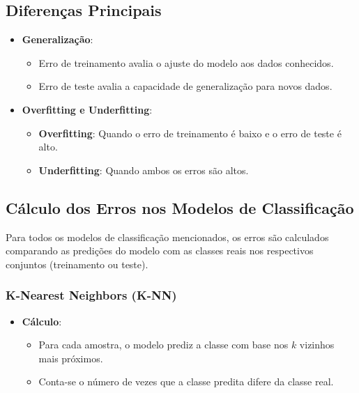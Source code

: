 \documentclass{sciposter}
\begin{document}
\begin{multicols}{3}
\subsection*{Diferenças Principais}

\begin{itemize}
    \item \textbf{Generalização}:
    \begin{itemize}
        \item Erro de treinamento avalia o ajuste do modelo aos dados conhecidos.
        \item Erro de teste avalia a capacidade de generalização para novos dados.
    \end{itemize}
    \item \textbf{Overfitting e Underfitting}:
    \begin{itemize}
        \item \textbf{Overfitting}: Quando o erro de treinamento é baixo e o erro de teste é alto.
        \item \textbf{Underfitting}: Quando ambos os erros são altos.
    \end{itemize}
\end{itemize}

\subsection*{Cálculo dos Erros nos Modelos de Classificação}

Para todos os modelos de classificação mencionados, os erros são calculados comparando as predições do modelo com as classes reais nos respectivos conjuntos (treinamento ou teste).

\subsubsection*{K-Nearest Neighbors (K-NN)}

\begin{itemize}
    \item \textbf{Cálculo}:
    \begin{itemize}
        \item Para cada amostra, o modelo prediz a classe com base nos $k$ vizinhos mais próximos.
        \item Conta-se o número de vezes que a classe predita difere da classe real.
    \end{itemize}
\end{itemize}


\end{multicols}
\end{document}
